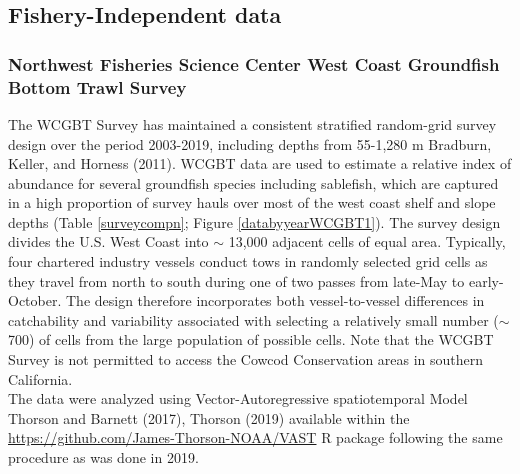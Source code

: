 \documentclass[11pt,
  english,
  a4paper,
]{article}
\begin{document}
\tagstructend


\hypertarget{fishery-independent-data}{%
\subsection{Fishery-Independent data}\label{fishery-independent-data}}

\leavevmode\tagmcend\tagstructend


\hypertarget{northwest-fisheries-science-center-west-coast-groundfish-bottom-trawl-survey}{%
\subsubsection{Northwest Fisheries Science Center West Coast Groundfish Bottom Trawl Survey}\label{northwest-fisheries-science-center-west-coast-groundfish-bottom-trawl-survey}}

\leavevmode\tagmcend\tagstructend

The WCGBT Survey has maintained a consistent stratified random-grid survey design over the period 2003-2019, including depths from 55-1,280 m {Bradburn, Keller, and Horness (2011)\leavevmode\tagmcend\tagstructend}. WCGBT data are used to estimate a relative index of abundance for several groundfish species including sablefish, which are captured in a high proportion of survey hauls over most of the west coast shelf and slope depths (Table \ref{surveycompn}; Figure \ref{databyyearWCGBT1}). The survey design divides the U.S. West Coast into {\(\sim\)\leavevmode\tagmcend\tagstructend} 13,000 adjacent cells of equal area. Typically, four chartered industry vessels conduct tows in randomly selected grid cells as they travel from north to south during one of two passes from late-May to early-October. The design therefore incorporates both vessel-to-vessel differences in catchability and variability associated with selecting a relatively small number ({\(\sim\)\leavevmode\tagmcend\tagstructend} 700) of cells from the large population of possible cells. Note that the WCGBT Survey is not permitted to access the Cowcod Conservation areas in southern California.\\
The data were analyzed using Vector-Autoregressive spatiotemporal Model {Thorson and Barnett (2017)\leavevmode\tagmcend\tagstructend}, {Thorson (2019)\leavevmode\tagmcend\tagstructend} available within the {\href{VAST}{https://github.com/James-Thorson-NOAA/VAST}\leavevmode\tagmcend\tagstructend} R package following the same procedure as was done in 2019.
\end{document}
